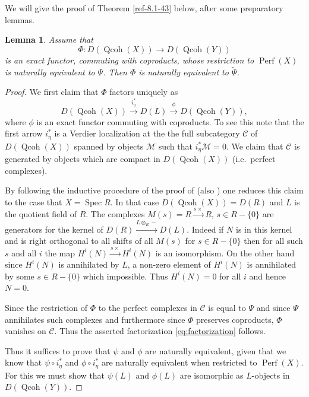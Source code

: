 \documentclass{amsart}
\numberwithin{equation}{section}
\let\cal\mathcal
\newtheorem{lemma}{Lemma}[section]
\theoremstyle{definition}
\theoremstyle{remark}
\begin{document}
We will give the proof of Theorem \ref{ref-8.1-43} below, after some preparatory lemmas.
\begin{lemma}
\label{ref-8.2-44}
Assume that
\[
\Phi:D({\operatorname{Qcoh}}(X)){\rightarrow} D({\operatorname{Qcoh}}(Y))
\]
is an exact functor, commuting with coproducts, whose restriction to ${\operatorname{Perf}}(X)$ is naturally equivalent
to $\Psi$. Then $\Phi$ is naturally equivalent to $\widetilde{\Psi}$.
\end{lemma}
\begin{proof} We first claim that $\Phi$ factors uniquely as 
\begin{equation}
\label{eq:factorization}
D({\operatorname{Qcoh}}(X))\xrightarrow{i^\ast_\eta} D(L)\xrightarrow{\phi} D({\operatorname{Qcoh}}(Y)),
\end{equation}
where $\phi$ is an exact functor commuting with coproducts. To see
this note that the first arrow $i^\ast_\eta$ is a Verdier localization
at the the full subcategory ${{\cal C}}$ of $D({\operatorname{Qcoh}}(X))$ spanned by objects ${{\cal M}}$
such that $i_\eta^\ast{{\cal M}}=0$. We claim that ${{\cal C}}$ is generated by objects
which are compact in $D({\operatorname{Qcoh}}(X))$ (i.e.\ perfect complexes). 

 By following
the inductive procedure of the proof of \cite[Prop. 2.5]{Neeman1} (also
\cite[Thm 3.1.1]{BondalVdB}) one reduces this claim to the case that $X={\operatorname {Spec}} R$.
In that case $D({\operatorname{Qcoh}}(X))=D(R)$ and $L$ is the quotient field of $R$. 
The complexes $M(s)=R\xrightarrow{s\times} R$, $s\in R-\{0\}$  
are generators for the kernel of $D(R)\xrightarrow{L\otimes_R-} D(L)$.
Indeed if $N$ is in this kernel and is right orthogonal to all shifts of all $M(s)$ for $s\in R-\{0\}$ then for 
all such $s$ and all $i$ the map $H^i(N)\xrightarrow{s\times} H^i(N)$ is an isomorphism. On the other hand
since $H^i(N)$ is annihilated by $L$, a non-zero element of $H^i(N)$ is annihilated
by some $s\in R-\{0\}$ which impossible. Thus $H^i(N)=0$ for all $i$ and hence $N=0$.

Since the restriction of $\Phi$ to the perfect complexes in ${{\cal C}}$ is equal to $\Psi$
and since $\Psi$ annihilates such complexes and 
furthermore  since $\Phi$ preserves coproducts, $\Phi$ vanishes on ${{\cal C}}$. Thus the asserted
factorization \eqref{eq:factorization} follows.

Thus it suffices to prove that $\psi$ and $\phi$ are naturally equivalent, given that
we know that $\psi\circ i^\ast_\eta$ and $\phi\circ i^\ast_\eta$ are naturally equivalent when restricted to ${\operatorname{Perf}}(X)$.
 For this 
we must show that $\psi(L)$ and $\phi(L)$ are isomorphic as $L$-objects in $D({\operatorname{Qcoh}}(Y))$.


\end{proof}
\end{document}
